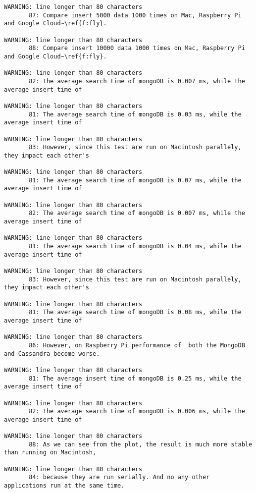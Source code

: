 \begin{tiny}
\begin{verbatim}
WARNING: line longer than 80 characters
       87: Compare insert 5000 data 1000 times on Mac, Raspberry Pi and Google Cloud~\ref{f:fly}.

WARNING: line longer than 80 characters
       88: Compare insert 10000 data 1000 times on Mac, Raspberry Pi and Google Cloud~\ref{f:fly}.

WARNING: line longer than 80 characters
       82: The average search time of mongoDB is 0.007 ms, while the average insert time of 

WARNING: line longer than 80 characters
       81: The average search time of mongoDB is 0.03 ms, while the average insert time of 

WARNING: line longer than 80 characters
       83: However, since this test are run on Macintosh parallely, they impact each other's 

WARNING: line longer than 80 characters
       81: The average search time of mongoDB is 0.07 ms, while the average insert time of 

WARNING: line longer than 80 characters
       82: The average search time of mongoDB is 0.007 ms, while the average insert time of 

WARNING: line longer than 80 characters
       81: The average search time of mongoDB is 0.04 ms, while the average insert time of 

WARNING: line longer than 80 characters
       83: However, since this test are run on Macintosh parallely, they impact each other's 

WARNING: line longer than 80 characters
       81: The average search time of mongoDB is 0.08 ms, while the average insert time of 

WARNING: line longer than 80 characters
       86: However, on Raspberry Pi performance of  both the MongoDB and Cassandra become worse.

WARNING: line longer than 80 characters
       81: The average insert time of mongoDB is 0.25 ms, while the average insert time of 

WARNING: line longer than 80 characters
       82: The average search time of mongoDB is 0.006 ms, while the average insert time of 

WARNING: line longer than 80 characters
       88: As we can see from the plot, the result is much more stable than running on Macintosh, 

WARNING: line longer than 80 characters
       84: because they are run serially. And no any other applications run at the same time. 


\end{verbatim}
\end{tiny}
